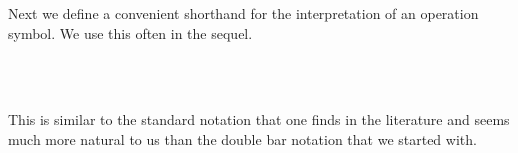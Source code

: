 \documentclass[a4paper,UKenglish,cleveref,autoref,thm-restate]{lipics-v2021}
\begin{document}
Next we define a convenient shorthand for the interpretation of an operation symbol. We use this often in the sequel.
\ccpad
\begin{code}%
\>[0][@{}l@{\AgdaIndent{1}}]%
\>[1]\AgdaSpace{}%
\AgdaSymbol{:}\AgdaSpace{}%
\AgdaSymbol{(}\AgdaSpace{}%
\AgdaSymbol{:}\AgdaSpace{}%
\AgdaSpace{}%
\AgdaSpace{}%
\AgdaSymbol{)(}\AgdaSpace{}%
\AgdaSymbol{:}\AgdaSpace{}%
\AgdaSpace{}%
\AgdaSpace{}%
\AgdaSymbol{)}\AgdaSpace{}%
\AgdaSpace{}%
\AgdaSymbol{(}\AgdaSpace{}%
\AgdaSpace{}%
\AgdaSpace{}%
%
\>[48]%
\>[51]\AgdaSpace{}%
\AgdaSpace{}%
\AgdaSymbol{)}\AgdaSpace{}%
\AgdaSpace{}%
\AgdaSpace{}%
\AgdaSpace{}%
\<%
\\
%
\\[\AgdaEmptyExtraSkip]%
%
\>[1]\AgdaSpace{}%
\AgdaSpace{}%
\AgdaSpace{}%
\AgdaSymbol{=}\AgdaSpace{}%
\AgdaSpace{}%
\AgdaSpace{}%
\AgdaSpace{}%
\AgdaSymbol{(}\AgdaSpace{}%
\AgdaSpace{}%
\AgdaSpace{}%
\AgdaSymbol{)}\AgdaSpace{}%
\<%
\end{code}
\ccpad
This is similar to the standard notation that one finds in the literature and seems much more natural to us than the double bar notation that we started with.
\end{document}
